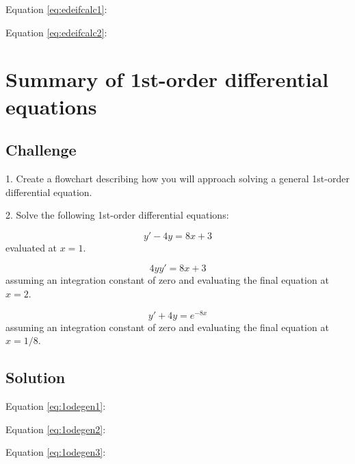 Equation \ref{eq:edeifcalc1}: 

Equation \ref{eq:edeifcalc2}: 


\timebox




\newpage
\section{Summary of 1st-order differential equations}

\subsection*{Challenge}
1. Create a flowchart describing how you will approach solving a general 1st-order differential equation.

2. Solve the following 1st-order differential equations:

\begin{equation}
    \label{eq:1odegen1}
    y' - 4y = 8x + 3
\end{equation}
evaluated at $x=1$.

\begin{equation}
    \label{eq:1odegen2}
    4yy' = 8x + 3
\end{equation}
assuming an integration constant of zero and evaluating the final equation at $x=2$.

\begin{equation}
    \label{eq:1odegen3}
    y' + 4y = e^{-8x}
\end{equation}
assuming an integration constant of zero and evaluating the final equation at $x=1/8$.

\subsection*{Solution}
Equation \ref{eq:1odegen1}: 

Equation \ref{eq:1odegen2}: 

Equation \ref{eq:1odegen3}: 

\timebox





